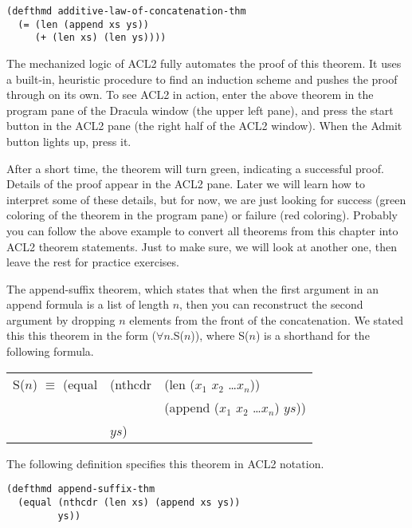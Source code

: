 \begin{lstlisting}
(defthmd additive-law-of-concatenation-thm
  (= (len (append xs ys))
     (+ (len xs) (len ys))))
\end{lstlisting}

The mechanized logic of ACL2 fully automates the proof of this theorem. 
It uses a built-in, heuristic procedure to find an induction scheme 
and pushes the proof through on its own. 
To see ACL2 in action, enter the above theorem in the program pane of the Dracula window 
(the upper left pane), and press the start button in the ACL2 pane 
(the right half of the ACL2 window). 
When the Admit button lights up, press it.

After a short time, the theorem will turn green, 
indicating a successful proof. Details of the proof appear in the ACL2 pane. 
Later we will learn how to interpret some of these details, 
but for now, we are just looking for success 
(green coloring of the theorem in the program pane) or failure (red coloring).
Probably you can follow the above example to convert all theorems 
from this chapter into ACL2 theorem statements. 
Just to make sure, we will look at another one, 
then leave the rest for practice exercises.

The append-suffix theorem, which states that 
when the first argument in an append formula is a list of length $n$, 
then you can reconstruct the second argument by dropping $n$ elements 
from the front of the concatenation. 
We stated this this theorem in the form ($\forall$$n$.S($n$)), 
where S($n$) is a shorthand for the following formula.

\begin{center}
\begin{tabular}{lll}
S($n$) $\equiv$ (equal & (nthcdr & (len ($x_1$ $x_2$ \dots $x_n$))          \\
                       &         & (append ($x_1$ $x_2$ \dots $x_n$) $ys$)) \\
                       & $ys$)   &                                          \\
\end{tabular}
\end{center}

The following definition specifies this theorem in ACL2 notation.

\begin{lstlisting}
(defthmd append-suffix-thm
  (equal (nthcdr (len xs) (append xs ys))
         ys))
\end{lstlisting}

